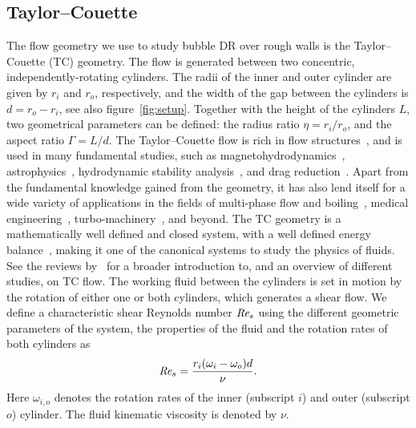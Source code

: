 \documentclass[aps,twocolumn,10pt,floatfix, superscriptaddress,longbibliography,pra]{revtex4-1}
\newcommand\Rey{\mbox{\textit{Re$_s$}}}  %
\begin{document}
\subsection{Taylor--Couette}
The flow geometry we use to study bubble DR over rough walls is the Taylor--Couette (TC) geometry. The flow is generated between two concentric, independently-rotating cylinders. The radii of the inner and outer cylinder are given by $r_i$ and $r_o$, respectively, and the width of the gap between the cylinders is $d = r_o - r_i$, see also figure~\ref{fig:setup}. Together with the height of the cylinders $L$, two geometrical parameters can be defined: the radius ratio $\eta = r_i/r_o$, and the aspect ratio $\Gamma = L/d$. The Taylor--Couette flow is rich in flow structures~\citep{Andereck1986}, and is used in many fundamental studies, such as magnetohydrodynamics~\citep{Chandrasekhar1961,Balbus1991}, astrophysics~\citep{Richard1999}, hydrodynamic stability analysis~\citep{Taylor1923}, and drag reduction~\citep{Srinivasan2015}. Apart from the fundamental knowledge gained from the geometry, it has also lend itself for a wide variety of applications in the fields of multi-phase flow and boiling~\citep{Ezeta2019}, medical engineering~\citep{Beaudoin1989,Wereley1999}, turbo-machinery~\citep{Jeng2007}, and beyond. The TC geometry is a mathematically well defined and closed system, with a well defined energy balance~\citep{Eckhardt2007}, making it one of the canonical systems to study the physics of fluids. See the reviews by~\cite{Fardin2014,Grossmann2016} for a broader introduction to, and an overview of different studies, on TC flow. The working fluid between the cylinders is set in motion by the rotation of either one or both cylinders, which generates a shear flow. We define a characteristic shear Reynolds number $\Rey$ using the different geometric parameters of the system, the properties of the fluid and the rotation rates of both cylinders as
    \begin{equation}\label{eq:Rey}
    \Rey = \frac{r_i (\omega_i - \omega_o) d}{\nu}.
    \end{equation}
Here $\omega_{i,o}$ denotes the rotation rates of the inner (subscript $i$) and outer (subscript $o$) cylinder. The fluid kinematic viscosity is denoted by $\nu$.
\end{document}
